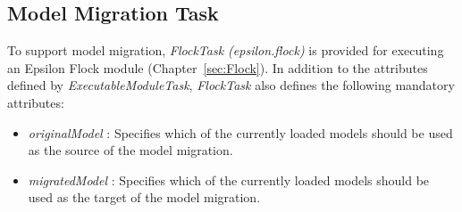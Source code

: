 
\subsection{Model Migration Task}
\label{sec:FlockTask}
To support model migration, \textit{FlockTask (epsilon.flock)} is provided for executing an Epsilon Flock module (Chapter~\ref{sec:Flock}). In addition to the attributes defined by \textit{ExecutableModuleTask}, \textit{FlockTask} also defines the following mandatory attributes:

\begin{itemize}
	\item \textit{originalModel} : Specifies which of the currently loaded models should be used as the source of the model migration.
	\item \textit{migratedModel} : Specifies which of the currently loaded models should be used as the target of the model migration.
\end{itemize}